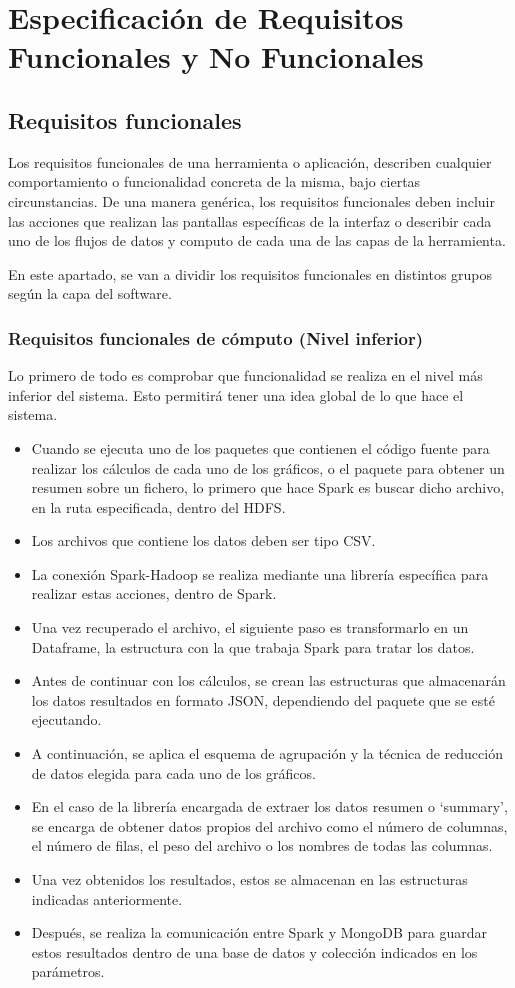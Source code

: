 \chapter{Especificación de Requisitos Funcionales y No Funcionales}

\section{Requisitos funcionales}
Los requisitos funcionales de una herramienta o aplicación, describen cualquier comportamiento o funcionalidad concreta de la misma, bajo ciertas circunstancias. De una manera genérica, los requisitos funcionales deben incluir las acciones que realizan las pantallas específicas de la interfaz o describir cada uno de los flujos de datos y computo de cada una de las capas de la herramienta.

En este apartado, se van a dividir los requisitos funcionales en distintos grupos según la capa del software.

\subsection{Requisitos funcionales de cómputo (Nivel inferior)}
Lo primero de todo es comprobar que funcionalidad se realiza en el nivel más inferior del sistema. Esto permitirá tener una idea global de lo que hace el sistema. 
\begin{itemize}
	\item Cuando se ejecuta uno de los paquetes que contienen el código fuente para realizar los cálculos de cada uno de los gráficos, o el paquete para obtener un resumen sobre un fichero, lo primero que hace Spark es buscar dicho archivo, en la ruta especificada, dentro del HDFS.
	\item Los archivos que contiene los datos deben ser tipo CSV.
	\item La conexión Spark-Hadoop se realiza mediante una librería específica para realizar estas acciones, dentro de Spark.
	\item Una vez recuperado el archivo, el siguiente paso es transformarlo en un Dataframe, la estructura con la que trabaja Spark para tratar los datos.
	\item Antes de continuar con los cálculos, se crean las estructuras que almacenarán los datos resultados en formato JSON, dependiendo del paquete que se esté ejecutando.
	\item A continuación, se aplica el esquema de agrupación y la técnica de reducción de datos elegida para cada uno de los gráficos.
	\item En el caso de la librería encargada de extraer los datos resumen o ‘summary’, se encarga de obtener datos propios del archivo como el número de columnas, el número de filas, el peso del archivo o los nombres de todas las columnas.
	\item Una vez obtenidos los resultados, estos se almacenan en las estructuras indicadas anteriormente. 
	\item Después, se realiza la comunicación entre Spark y MongoDB para guardar estos resultados dentro de una base de datos y colección indicados en los parámetros.
\end{itemize}

